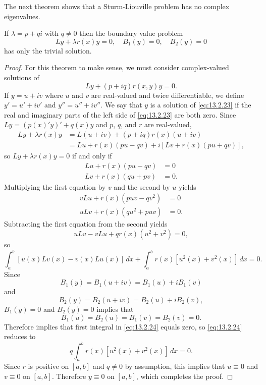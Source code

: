 The next theorem shows that a Sturm-Liouville problem has no complex
eigenvalues.

\begin{theorem}\label{thmtype:13.2.3}
If $\lambda=p+qi$ with $q\ne0$  then the boundary value problem
\[
Ly+\lambda r(x)y=0,\quad B_{1}(y)=0,\quad B_{2}(y)=0
\]
has only the trivial solution.
\end{theorem}

\begin{proof}
For this theorem to make sense, we must consider complex-valued
solutions  of
\begin{equation} \label{eq:13.2.23}
Ly+(p+iq)r(x,y)y=0.
\end{equation}
If $y=u+iv$ where $u$ and $v$ are real-valued and twice differentiable,
we define $y'=u'+iv'$ and $y''=u''+iv''$. We say that $y$  is a solution of
\eqref{eq:13.2.23} if
the   real and imaginary parts of the left side of \eqref{eq:13.2.23} are both
zero.  Since $Ly=(p(x)'y)'+q(x)y$  and $p$, $q$, and $r$ are real-valued,
\begin{align*}
Ly+\lambda
r(x)y&=L(u+iv)+(p+iq)r(x)(u+iv)\\
&=Lu+r(x)(pu-qv)+i[Lv+r(x)(pu+qv)],
\end{align*}
so $Ly+\lambda r(x)y=0$ if and only if
\begin{align*}
Lu+r(x)(pu-qv)&=0\\
Lv+r(x)(qu+pv)&=0.
\end{align*}
Multiplying the first equation by $v$ and the second by $u$  yields
\begin{align*}
vLu+r(x)(puv-qv^{2})&=0\\
uLv+r(x)(qu^{2}+puv)&=0.
\end{align*}
Subtracting the first equation from the second yields
\[
uLv-vLu+qr(x)(u^{2}+v^{2})=0,
\]
so
\begin{equation} \label{eq:13.2.24}
\int_{a}^{b}[u(x)Lv(x)-v(x)Lu(x)]\,dx+
\int_{a}^{b}r(x)[u^{2}(x)+v^{2}(x)]\,dx=0.
\end{equation}
Since
\[
B_{1}(y)=B_{1}(u+iv)=B_{1}(u)+iB_{1}(v)
\]
and
\[
B_{2}(y)=B_{2}(u+iv)=B_{2}(u)+iB_{2}(v),
\]
$B_{1}(y)=0$ and $B_{2}(y)=0$  implies that
\[
B_{1}(u)=B_{2}(u)=B_{1}(v)=B_{2}(v)=0.
\]
 Therefore 
implies that  first integral in
\eqref{eq:13.2.24} equals zero, so \eqref{eq:13.2.24} reduces to
\[
q\int_{a}^{b}r(x)[u^{2}(x)+v^{2}(x)]\,dx =0.
\]
Since $r$ is positive on $[a,b]$  and $q\ne0$ by assumption, this implies
that $u\equiv0$ and $v\equiv0$ on $[a,b]$. Therefore $y\equiv0$ on
$[a,b]$, which completes the proof.
\end{proof}

